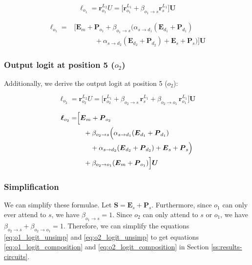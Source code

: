 \begin{equation}
    \boldsymbol \ell_{o_1} = \boldsymbol r_{o_1}^{L_2}U = \big[\boldsymbol r_{o_1}^{L_1} + \beta_{o_1 \to s}\boldsymbol r_s^{L_1}\big]\boldsymbol U
\end{equation}

\begin{equation}
\label{eq:o1_logit_unsimp}
\begin{split}
    \boldsymbol \ell_{o_1} = 
    &\bigl[\boldsymbol E_m + \boldsymbol P_{o_1} 
    + \beta_{o_1 \to s} \bigl(
    \alpha_{s \to d_1}(\boldsymbol E_{d_1} + \boldsymbol P_{d_1}) \\
    &\qquad\quad
    + \alpha_{s \to d_2}(\boldsymbol E_{d_2} + \boldsymbol P_{d_2})
    + \boldsymbol E_s + \boldsymbol P_s
    \bigr)
    \bigr]\boldsymbol U
\end{split}
\end{equation}


\subsubsection*{Output logit at position 5 ($o_2$)}
Additionally, we derive the output logit at position 5 ($o_2$):

\begin{equation}
    \boldsymbol \ell_{o_2} = \boldsymbol r_{o_2}^{L_2}U = \big[\boldsymbol r_{o_2}^{L_1} + \beta_{o_2 \to s}\,\boldsymbol r_s^{L_1} + \beta_{o_2 \to o_1}\,\boldsymbol r_{o_1}^{L_1}\big]\boldsymbol U
\end{equation}

\begin{equation}
\label{eq:o2_logit_unsimp}
\begin{split}
    \boldsymbol \ell_{o_2} = 
    &\Bigl[\boldsymbol E_m + \boldsymbol P_{o_2} \\
    &\quad + \beta_{o_2 \to s} \Bigl(
        \alpha_{s \to d_1}(\boldsymbol E_{d_1} + \boldsymbol P_{d_1}) \\
        &\qquad + \alpha_{s \to d_2}(\boldsymbol E_{d_2} + \boldsymbol P_{d_2}) 
        + \boldsymbol E_s + \boldsymbol P_s
    \Bigr) \\
    &\quad + \beta_{o_2 \to o_1}(\boldsymbol E_m + \boldsymbol P_{o_1})
    \Bigr]\boldsymbol U
\end{split}
\end{equation}

\subsubsection*{Simplification}
We can simplify these formulae.
Let
\(
    \boldsymbol S = \boldsymbol E_s + \boldsymbol P_s
\).
Furthermore, since $o_1$ can only ever attend to $s$, we have $\beta_{o_1 \to s}=1$. Since $o_2$ can only attend to $s$ or $o_1$, we have $\beta_{o_2 \to s} + \beta_{o_2 \to o_1} = 1$. Therefore, we can simplify the equations \eqref{eq:o1_logit_unsimp} and \eqref{eq:o2_logit_unsimp} to get equations \eqref{eq:o1_logit_composition} and \eqref{eq:o2_logit_composition} in Section \ref{ss:results-circuits}.